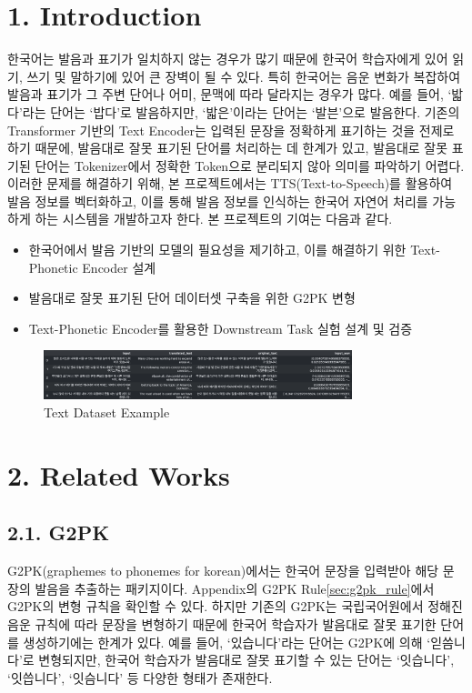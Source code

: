 \documentclass[letterpaper]{article} %
\begin{document}
\section{1. Introduction}
한국어는 발음과 표기가 일치하지 않는 경우가 많기 때문에 한국어 학습자에게 있어 읽기, 쓰기 및 말하기에 있어 큰 장벽이 될 수 있다.
특히 한국어는 음운 변화가 복잡하여 발음과 표기가 그 주변 단어나 어미, 문맥에 따라 달라지는 경우가 많다. 예를 들어, `밟다'라는 단어는 `밥다'로 발음하지만, `밟은'이라는 단어는 `발븐'으로 발음한다.
기존의 Transformer 기반의 Text Encoder는 입력된 문장을 정확하게 표기하는 것을 전제로 하기 때문에, 발음대로 잘못 표기된 단어를 처리하는 데 한계가 있고, 발음대로 잘못 표기된 단어는 Tokenizer에서 정확한 Token으로 분리되지 않아 의미를 파악하기 어렵다.
이러한 문제를 해결하기 위해, 본 프로젝트에서는 TTS(Text-to-Speech)를 활용하여 발음 정보를 벡터화하고, 이를 통해 발음 정보를 인식하는 한국어 자연어 처리를 가능하게 하는 시스템을 개발하고자 한다.
본 프로젝트의 기여는 다음과 같다.
\begin{itemize}
    \item 한국어에서 발음 기반의 모델의 필요성을 제기하고, 이를 해결하기 위한 Text-Phonetic Encoder 설계
    \item 발음대로 잘못 표기된 단어 데이터셋 구축을 위한 G2PK 변형
    \item Text-Phonetic Encoder를 활용한 Downstream Task 실험 설계 및 검증
\end{itemize}
\begin{figure}[ht]
    \centering
    \includegraphics[width=0.8\textwidth]{figures/text_dataset_example.png}
    \caption{Text Dataset Example}
    \label{fig:text_dataset_example}
\end{figure}
\section{2. Related Works}
\subsection{2.1. G2PK}
G2PK(graphemes to phonemes for korean)에서는 한국어 문장을 입력받아 해당 문장의 발음을 추출하는 패키지이다.
Appendix의 G2PK Rule\ref{sec:g2pk_rule}에서 G2PK의 변형 규칙을 확인할 수 있다.
하지만 기존의 G2PK는 국립국어원에서 정해진 음운 규칙에 따라 문장을 변형하기 때문에 한국어 학습자가 발음대로 잘못 표기한 단어를 생성하기에는 한계가 있다.
예를 들어, `있습니다'라는 단어는 G2PK에 의해 `읻씀니다'로 변형되지만, 한국어 학습자가 발음대로 잘못 표기할 수 있는 단어는 `잇습니다', `잇씁니다', `잇슴니다' 등 다양한 형태가 존재한다.
\end{document}
